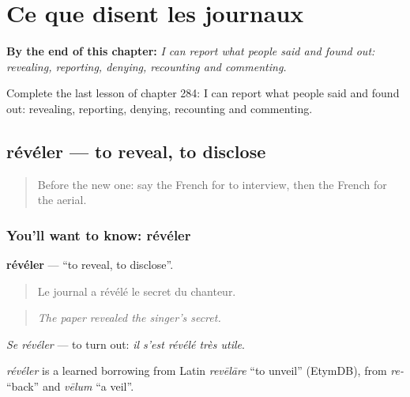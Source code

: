 
\chapter{Ce que disent les journaux}
\label{ch:fr-ce-que-disent-les-journaux}

\begin{chapteropening}
\textbf{By the end of this chapter:} \emph{I can report what people said and found out: revealing, reporting, denying, recounting and commenting.}

Complete the last lesson of chapter 284: I can report what people said and found out: revealing, reporting, denying, recounting and commenting.
\end{chapteropening}

\section[révéler]{révéler — to reveal, to disclose}

\label{lesson:FR-C284-reveler}



\begin{quote}
Before the new one: say the French for to interview, then the French for the aerial.
\end{quote}

\subsection*{You'll want to know: révéler}
\textbf{révéler} — \textquotedblleft{}to reveal, to disclose\textquotedblright{}.

\begin{quote}
Le journal a révélé le secret du chanteur.
\end{quote}

\begin{quote}
\emph{The paper revealed the singer's secret.}
\end{quote}

\emph{Se révéler} — to turn out: \emph{il s'est révélé très utile}.

\begin{cousinweb}
\emph{révéler} is a learned borrowing from Latin \emph{revēlāre} \textquotedblleft{}to unveil\textquotedblright{} (EtymDB), from \emph{re-} \textquotedblleft{}back\textquotedblright{} and \emph{vēlum} \textquotedblleft{}a veil\textquotedblright{}.
\end{cousinweb}

